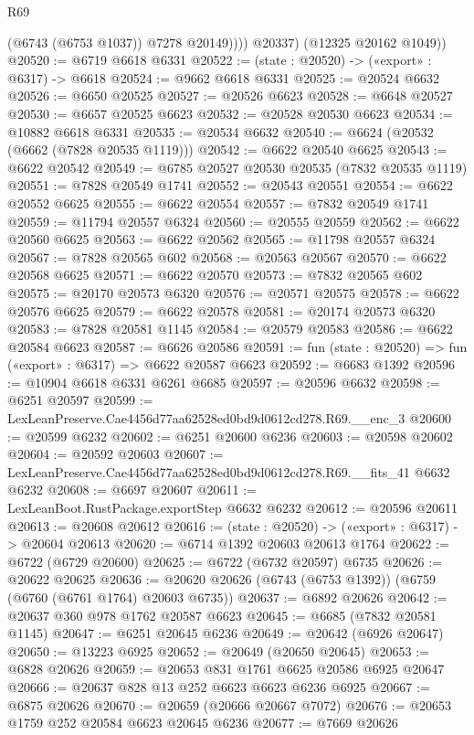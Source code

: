 \begin{lexlean}{R69}
\begin{coremodule}
{                (@6743 (@6753 @1037))
                @7278
                @20149))))
        @20337)
      (@12325 @20162 @1049))
@20520 := @6719 @6618 @6331
@20522 := (state : @20520) -> («export» : @6317) -> @6618
@20524 := @9662 @6618 @6331
@20525 := @20524 @6632
@20526 := @6650 @20525
@20527 := @20526 @6623
@20528 := @6648 @20527
@20530 := @6657 @20525 @6623
@20532 := @20528 @20530 @6623
@20534 := @10882 @6618 @6331
@20535 := @20534 @6632
@20540 := @6624 (@20532 (@6662 (@7828 @20535 @1119)))
@20542 := @6622 @20540 @6625
@20543 := @6622 @20542
@20549 := @6785 @20527 @20530 @20535 (@7832 @20535 @1119)
@20551 := @7828 @20549 @1741
@20552 := @20543 @20551
@20554 := @6622 @20552 @6625
@20555 := @6622 @20554
@20557 := @7832 @20549 @1741
@20559 := @11794 @20557 @6324
@20560 := @20555 @20559
@20562 := @6622 @20560 @6625
@20563 := @6622 @20562
@20565 := @11798 @20557 @6324
@20567 := @7828 @20565 @602
@20568 := @20563 @20567
@20570 := @6622 @20568 @6625
@20571 := @6622 @20570
@20573 := @7832 @20565 @602
@20575 := @20170 @20573 @6320
@20576 := @20571 @20575
@20578 := @6622 @20576 @6625
@20579 := @6622 @20578
@20581 := @20174 @20573 @6320
@20583 := @7828 @20581 @1145
@20584 := @20579 @20583
@20586 := @6622 @20584 @6623
@20587 := @6626 @20586
@20591 := fun (state : @20520) => fun («export» : @6317) => @6622 @20587 @6623
@20592 := @6683 @1392
@20596 := @10904 @6618 @6331 @6261 @6685
@20597 := @20596 @6632
@20598 := @6251 @20597
@20599 := LexLeanPreserve.Cae4456d77aa62528ed0bd9d0612cd278.R69.__enc_3
@20600 := @20599 @6232
@20602 := @6251 @20600 @6236
@20603 := @20598 @20602
@20604 := @20592 @20603
@20607 := LexLeanPreserve.Cae4456d77aa62528ed0bd9d0612cd278.R69.__fits_41 @6632 @6232
@20608 := @6697 @20607
@20611 := LexLeanBoot.RustPackage.exportStep @6632 @6232
@20612 := @20596 @20611
@20613 := @20608 @20612
@20616 := (state : @20520) -> («export» : @6317) -> @20604 @20613
@20620 := @6714 @1392 @20603 @20613 @1764
@20622 := @6722 (@6729 @20600)
@20625 := @6722 (@6732 @20597) @6735
@20626 := @20622 @20625
@20636 := @20620 @20626 (@6743 (@6753 @1392)) (@6759 (@6760 (@6761 @1764) @20603 @6735))
@20637 := @6892 @20626
@20642 := @20637 @360 @978 @1762 @20587 @6623
@20645 := @6685 (@7832 @20581 @1145)
@20647 := @6251 @20645 @6236
@20649 := @20642 (@6926 @20647)
@20650 := @13223 @6925
@20652 := @20649 (@20650 @20645)
@20653 := @6828 @20626
@20659 := @20653 @831 @1761 @6625 @20586 @6925 @20647
@20666 := @20637 @828 @13 @252 @6623 @6623 @6236 @6925
@20667 := @6875 @20626
@20670 := @20659 (@20666 @20667 @7072)
@20676 := @20653 @1759 @252 @20584 @6623 @20645 @6236
@20677 := @7669 @20626
}
\end{coremodule}
\end{lexlean}

